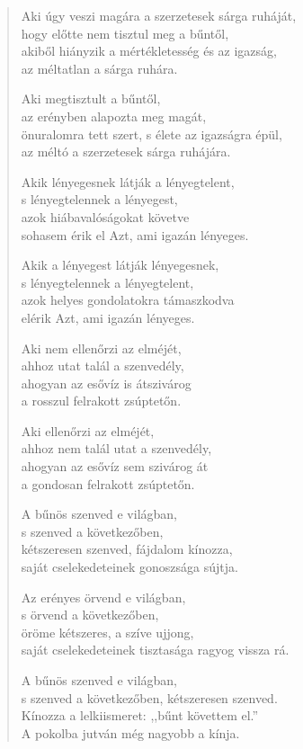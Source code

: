 \begin{verse}
 Aki úgy veszi magára a szerzetesek sárga ruháját,\\
hogy előtte nem tisztul meg a bűntől,\\
akiből hiányzik a mértékletesség és az igazság,\\
az méltatlan a sárga ruhára.

 Aki megtisztult a bűntől,\\
az erényben alapozta meg magát,\\
önuralomra tett szert, s élete az igazságra épül,\\
az méltó a szerzetesek sárga ruhájára.

 Akik lényegesnek látják a lényegtelent,\\
s lényegtelennek a lényegest,\\
azok hiábavalóságokat követve\\
sohasem érik el Azt, ami igazán lényeges.

 Akik a lényegest látják lényegesnek,\\
s lényegtelennek a lényegtelent,\\
azok helyes gondolatokra támaszkodva\\
elérik Azt, ami igazán lényeges.

 Aki nem ellenőrzi az elméjét,\\
ahhoz utat talál a szenvedély,\\
ahogyan az esővíz is átszivárog\\
a rosszul felrakott zsúptetőn.

 Aki ellenőrzi az elméjét,\\
ahhoz nem talál utat a szenvedély,\\
ahogyan az esővíz sem szivárog át\\
a gondosan felrakott zsúptetőn.

 A bűnös szenved e világban,\\
s szenved a következőben,\\
kétszeresen szenved, fájdalom kínozza,\\
saját cselekedeteinek gonoszsága sújtja.

 Az erényes örvend e világban,\\
s örvend a következőben,\\
öröme kétszeres, a szíve ujjong,\\
saját cselekedeteinek tisztasága ragyog vissza rá.

 A bűnös szenved e világban,\\
s szenved a következőben, kétszeresen szenved.\\
Kínozza a lelkiismeret: ,,bűnt követtem el.''\\
A pokolba jutván még nagyobb a kínja.


\end{verse}
